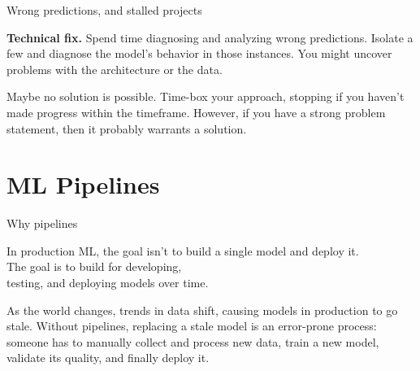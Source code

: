 \begin{frame}{Wrong predictions, and stalled projects}
  \begin{withmargin}
    \begin{tdmargin}
      \textbf{Technical fix.} Spend time diagnosing and analyzing wrong
      predictions. Isolate a few and diagnose the model's behavior in those
      instances. You might uncover problems with the architecture or the data.
      \par\medskip
      Maybe no solution is possible. Time-box your approach, stopping if you
      haven't made progress within the timeframe. However, if you have a strong
      problem statement, then it probably warrants a solution.
    \end{tdmargin}
  \end{withmargin}
\end{frame}

\section[Pipelines]{ML Pipelines}

\begin{frame}{Why pipelines}
  \vfill
  \begin{takeaway}
    In production ML, the goal isn't to build a single model and deploy it.\\
    The goal is to build  for developing,\\
    testing, and deploying models over time.
  \end{takeaway}
  \vfill
  {\small As the world changes, trends in data shift, causing models in
  production to go stale. Without pipelines, replacing a stale model is an
  error-prone process: someone has to manually collect and process new data,
  train a new model, validate its quality, and finally deploy it.}
\end{frame}

